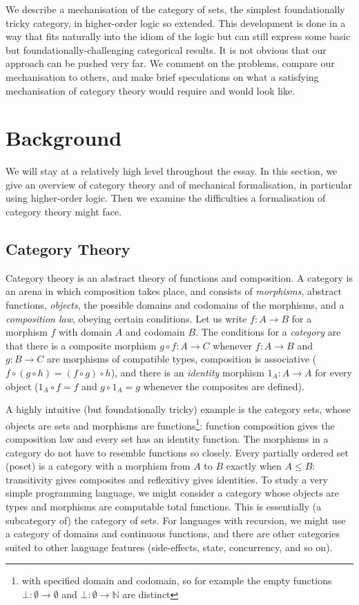 \documentclass[twoside,titlepage,11pt]{article}
\begin{document}
We describe a mechanisation of the category of sets, the simplest foundationally tricky category, in higher-order logic so extended.
This development is done in a way that fits naturally into the idiom of the logic but can still express some basic but foundationally-challenging categorical results.
It is not obvious that our approach can be pushed very far.
We comment on the problems, compare our mechanisation to others, and make brief speculations on what a satisfying mechanisation of category theory would require and would look like.
\section{Background}%
We will stay at a relatively high level throughout the essay.
In this section, we give an overview of category theory and of mechanical formalisation, in particular using higher-order logic.
Then we examine the difficulties a formalisation of category theory might face.
\subsection{Category Theory}%
Category theory is an abstract theory of functions and composition.
A category is an arena in which composition takes place, and consists of \emph{morphisms}, abstract functions, \emph{objects}, the possible domains and codomains of the morphisms, and a \emph{composition law}, obeying certain conditions.
Let us write $f:A\to B$ for a morphism $f$ with domain $A$ and codomain $B$.
The conditions for a \emph{category} are that there is a composite morphism $g\circ f:A\to C$ whenever $f:A\to B$ and $g:B\to C$ are morphisms of compatible types, composition is associative ($f\circ(g\circ h)=(f\circ g)\circ h$), and there is an \emph{identity} morphism ${1_A}:A\to A$ for every object (${1_A}\circ f=f$ and $g\circ{1_A}=g$ whenever the composites are defined).%

A highly intuitive (but foundationally tricky) example is the category sets, whose objects are sets and morphisms are functions\footnote{with specified domain and codomain, so for example the empty functions $\bot:\emptyset\to\emptyset$ and $\bot:\emptyset\to\mathbb{N}$ are distinct}: function composition gives the composition law and every set has an identity function.
The morphisms in a category do not have to resemble functions so closely.
Every partially ordered set (poset) is a category with a morphism from $A$ to $B$ exactly when $A\leq B$: transitivity gives composites and reflexitivy gives identities.
To study a very simple programming language, we might consider a category whose objects are types and morphisms are computable total functions.
This is essentially (a subcategory of) the category of sets.
For languages with recursion, we might use a category of domains and continuous functions, and there are other categories suited to other language features (side-effects, state, concurrency, and so on).%
\end{document}
